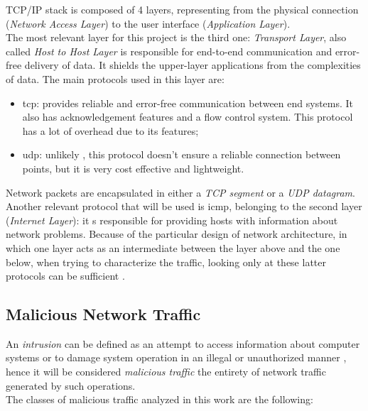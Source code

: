 TCP/IP stack is composed of 4 layers, representing from the physical connection (\textit{Network Access Layer}) to the user interface (\textit{Application Layer}). \\ The most relevant layer for this project is the third one: \textit{Transport Layer}, also called \textit{Host to Host Layer} is responsible for end-to-end communication and error-free delivery of data. It shields the upper-layer applications from the complexities of data. The main protocols used in this layer are:

\begin{itemize}
    \item[\faCaretRight] \gls{tcp}: provides reliable and error-free communication between end systems. It also has acknowledgement features and a flow control system. This protocol has a lot of overhead due to its features;
    \item[\faCaretRight] \gls{udp}: unlikely , this protocol doesn't ensure a reliable connection between points, but it is very cost effective and lightweight.
\end{itemize}
Network packets are encapsulated in either a \textit{TCP segment} or a \textit{UDP datagram}. Another relevant protocol that will be used is \gls{icmp}, belonging to the second layer (\textit{Internet Layer}): it s responsible for providing hosts with information about network problems. Because of the particular design of network architecture, in which one layer acts as an intermediate between the layer above and the one below, when trying to characterize the traffic, looking only at these latter protocols can be sufficient \cite{Iglesias2015}.


\subsection{Malicious Network Traffic}
\label{subsec:malicious-traffic}

An \textit{intrusion} can be defined as an attempt to access information about computer systems or to damage system operation in an illegal or unauthorized manner \cite{Liu2019}, hence it will be considered \textit{malicious traffic} the entirety of network traffic generated by such operations. \\
The classes of malicious traffic analyzed in this work are the following:

